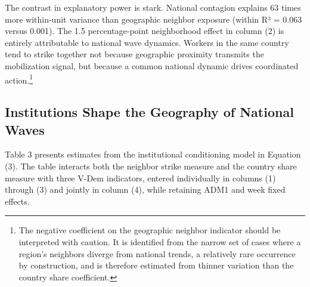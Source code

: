 \documentclass[
  11pt,
]{article}
\begin{document}
The contrast in explanatory power is stark. National contagion explains
63 times more within-unit variance than geographic neighbor exposure
(within R² = 0.063 versus 0.001). The 1.5 percentage-point neighborhood
effect in column (2) is entirely attributable to national wave dynamics.
Workers in the same country tend to strike together not because
geographic proximity transmits the mobilization signal, but because a
common national dynamic drives coordinated action.\footnote{The negative
  coefficient on the geographic neighbor indicator should be interpreted
  with caution. It is identified from the narrow set of cases where a
  region's neighbors diverge from national trends, a relatively rare
  occurrence by construction, and is therefore estimated from thinner
  variation than the country share coefficient.}

\subsection{Institutions Shape the Geography of National
Waves}\label{institutions-shape-the-geography-of-national-waves}

Table 3 presents estimates from the institutional conditioning model in
Equation (3). The table interacts both the neighbor strike measure and
the country share measure with three V-Dem indicators, entered
individually in columns (1) through (3) and jointly in column (4), while
retaining ADM1 and week fixed effects.
\end{document}
